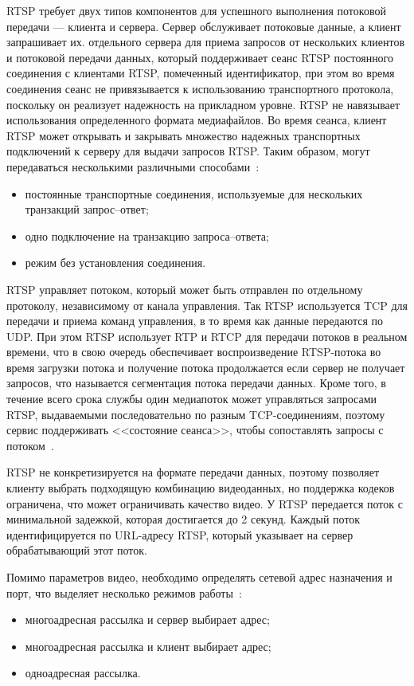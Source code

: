 RTSP требует двух типов компонентов для успешного выполнения потоковой передачи --- клиента и сервера. Сервер обслуживает потоковые данные, а клиент запрашивает их. отдельного сервера для приема запросов от нескольких клиентов и потоковой передачи данных, который поддерживает сеанс RTSP постоянного соединения с клиентами RTSP, помеченный идентификатор, при этом во время соединения сеанс не привязывается к использованию транспортного протокола, поскольку он реализует надежность на прикладном уровне. RTSP не навязывает использования определенного формата медиафайлов.
Во время сеанса, клиент RTSP может открывать и закрывать множество надежных транспортных подключений к серверу для выдачи запросов RTSP. 
Таким образом, могут передаваться несколькими различными способами~\cite{rfc_rtsp}:
\begin{itemize}
	\item постоянные транспортные соединения, используемые для нескольких транзакций запрос--ответ;
	\item одно подключение на транзакцию запроса--ответа;
	\item режим без установления соединения. 
\end{itemize}

RTSP управляет потоком, который может быть отправлен по отдельному протоколу, независимому от канала управления.
Так RTSP используется TCP для передачи и приема команд управления, в то время как данные передаются по UDP. При этом RTSP использует RTP и RTCP для передачи потоков в реальном времени, что в свою очередь обеспечивает воспроизведение RTSP-потока во время загрузки потока и получение потока продолжается если сервер не получает запросов, что называется сегментация потока передачи данных. 
Кроме того, в течение всего срока службы один медиапоток может управляться запросами RTSP, выдаваемыми последовательно по разным TCP-соединениям, поэтому сервис поддерживать <<состояние сеанса>>, чтобы сопоставлять запросы с потоком~\cite{rfc_rtsp}. 

RTSP не конкретизируется на формате передачи данных, поэтому позволяет клиенту выбрать подходящую комбинацию видеоданных, но поддержка кодеков ограничена, что может ограничивать качество видео. У RTSP передается поток с минимальной задежкой, которая достигается до 2 секунд.
Каждый поток идентифицируется по URL-адресу RTSP, который указывает на сервер обрабатывающий этот поток.

\clearpage 

Помимо параметров видео, необходимо определять сетевой адрес назначения и порт, что выделяет несколько режимов работы~\cite{rfc_rtsp}:
\begin{itemize}
	\item многоадресная рассылка и сервер выбирает адрес;
	\item многоадресная рассылка и клиент выбирает адрес;
	\item одноадресная рассылка.
\end{itemize}


